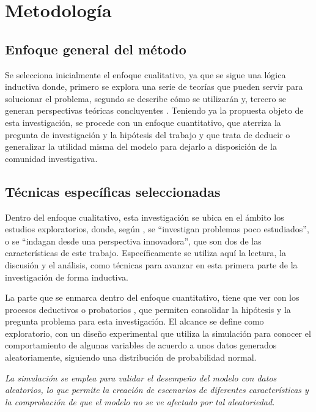 \section{Metodología}

\subsection{Enfoque general del método}

Se selecciona inicialmente el enfoque cualitativo, ya que se sigue una lógica inductiva donde, primero se explora una serie de teorías que pueden servir para solucionar el problema, segundo se describe cómo se utilizarán y, tercero se generan perspectivas teóricas concluyentes \citep{hernandez2010metodologia}. Teniendo ya la propuesta objeto de esta investigación, se procede con un enfoque cuantitativo, que aterriza la pregunta de investigación y la hipótesis del trabajo y que trata de deducir o generalizar la utilidad misma del modelo para dejarlo a disposición de la comunidad investigativa. 

\subsection{Técnicas específicas seleccionadas}

Dentro del enfoque cualitativo, esta investigación se ubica en el ámbito los estudios exploratorios, donde, según \citet{hernandez2010metodologia}, se ``investigan problemas poco estudiados'', o se “indagan desde una perspectiva innovadora”, que son dos de las características de este trabajo. Específicamente se utiliza aquí la lectura, la discusión y el análisis, como técnicas para avanzar en esta primera parte de la investigación de forma inductiva.

La parte que se enmarca dentro del enfoque cuantitativo, tiene que ver con los procesos deductivos o probatorios \citep{hernandez2010metodologia}, que permiten consolidar la hipótesis y la pregunta problema para esta investigación. El alcance se define como exploratorio, con un diseño experimental que utiliza la simulación para conocer el comportamiento de algunas variables de acuerdo a unos datos generados aleatoriamente, siguiendo una distribución de probabilidad normal.

\textit{La simulación se emplea para validar el desempeño del modelo con datos aleatorios, lo que permite la creación de escenarios de diferentes características y la comprobación de que el modelo no se ve afectado por tal aleatoriedad.}

